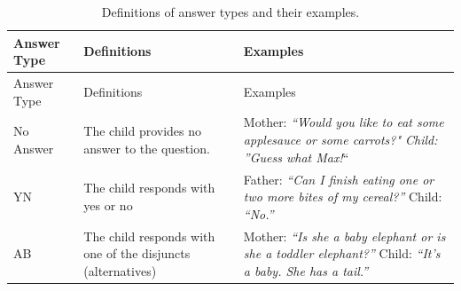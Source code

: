 \documentclass[oneside]{report}
\theoremstyle{definition}
\theoremstyle{definition}
\theoremstyle{definition}
\theoremstyle{remark}
\begin{document}
\begin{longtable}[]{@{}lll@{}}
\caption{\label{tab:answerTypes} Definitions of answer types and their
examples.}\tabularnewline
\toprule
\begin{minipage}[b]{0.11\columnwidth}\raggedright\strut
Answer Type\strut
\end{minipage} & \begin{minipage}[b]{0.32\columnwidth}\raggedright\strut
Definitions\strut
\end{minipage} & \begin{minipage}[b]{0.38\columnwidth}\raggedright\strut
Examples\strut
\end{minipage}\tabularnewline
\midrule
\endfirsthead
\toprule
\begin{minipage}[b]{0.11\columnwidth}\raggedright\strut
Answer Type\strut
\end{minipage} & \begin{minipage}[b]{0.32\columnwidth}\raggedright\strut
Definitions\strut
\end{minipage} & \begin{minipage}[b]{0.38\columnwidth}\raggedright\strut
Examples\strut
\end{minipage}\tabularnewline
\midrule
\endhead
\begin{minipage}[t]{0.11\columnwidth}\raggedright\strut
No Answer\strut
\end{minipage} & \begin{minipage}[t]{0.32\columnwidth}\raggedright\strut
The child provides no answer to the question.\strut
\end{minipage} & \begin{minipage}[t]{0.38\columnwidth}\raggedright\strut
Mother: \emph{``Would you like to eat some applesauce or some
carrots?\emph{" Child: }''Guess what Max!}``\strut
\end{minipage}\tabularnewline
\begin{minipage}[t]{0.11\columnwidth}\raggedright\strut
YN\strut
\end{minipage} & \begin{minipage}[t]{0.32\columnwidth}\raggedright\strut
The child responds with yes or no\strut
\end{minipage} & \begin{minipage}[t]{0.38\columnwidth}\raggedright\strut
Father: \emph{``Can I finish eating one or two more bites of my
cereal?''} Child: \emph{``No.''}\strut
\end{minipage}\tabularnewline
\begin{minipage}[t]{0.11\columnwidth}\raggedright\strut
AB\strut
\end{minipage} & \begin{minipage}[t]{0.32\columnwidth}\raggedright\strut
The child responds with one of the disjuncts (alternatives)\strut
\end{minipage} & \begin{minipage}[t]{0.38\columnwidth}\raggedright\strut
Mother: \emph{``Is she a baby elephant or is she a toddler elephant?''}
Child: \emph{``It's a baby. She has a tail.''}\strut
\end{minipage}\tabularnewline
\bottomrule
\end{longtable}
\end{document}
